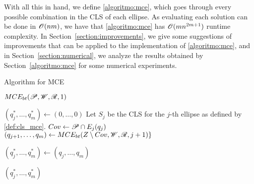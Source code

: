 With all this in hand, we define \autoref{algoritmo:mce}, which goes through every possible combination in the CLS of each ellipse. As evaluating each solution can be done in $\mathscr{O}(nm)$, we have that \autoref{algoritmo:mce} has $\mathscr{O}(mn^{2m+1})$ runtime complexity. 
In Section~\ref{section:improvements}, we give some suggestions of improvements that can be applied to the implementation of \autoref{algoritmo:mce}, and in Section~\ref{section:numerical}, we analyze the results obtained by Section~\ref{algoritmo:mce} for some numerical experiments.

\begin{algorithm}
	\caption{Algorithm for MCE}\label{algoritmo:mce}
	
	\begin{algorithmic}[1]
		
		
		\item[]
		\State \Return $MCE_{bt}(\mathscr{P}, \mathscr{W}, \mathscr{R}, 1)$
		\EndProcedure
		
		\item[]
		
		\State $(q_j^*, \dots, q_m^*) \gets (0, \dots, 0)$
		\State Let $S_j$ be the CLS for the $j$-th ellipse as defined by \autoref{def:cls_mce}.
			\State $Cov \gets \mathscr{P} \cap E_j(q_j)$
				\State $(q_{j+1}, \dots, q_m) \gets MCE_{bt}(Z \setminus Cov, \mathscr{W}, \mathscr{R}, j+1)\}$
			\EndIf
			
			\State $(q_j^*, \dots, q_m^*) \gets(q_j, \dots, q_m)$
			\EndIf
		\EndFor
		
		\State \Return $(q_j^*, \dots, q_m^*)$
		\EndProcedure
	\end{algorithmic}
\end{algorithm}